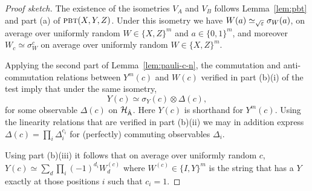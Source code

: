 \begin{proof}[Proof sketch]
The existence of the isometries $V_A$ and $V_B$ follows Lemma~\ref{lem:pbt} and part (a) of $\textsc{pbt}(X,Y,Z)$. 
 Under this isometry we have $W(a) \simeq_{\sqrt{\varepsilon}} \sigma_W(a)$, on average over uniformly random $W\in\{X,Z\}^m$ and $a\in\{0,1\}^m$, and moreover $W_c \simeq \sigma_W^c$ on average over uniformly random $W\in\{X,Z\}^m$. 

Applying the second part of Lemma~\ref{lem:pauli-c-n},  the  commutation and anti-commutation relations between $Y^m(c)$ and $W(c)$ verified in part (b)(i) of the test imply that under the same isometry,
$$ Y(c) \simeq \sigma_Y(c) \otimes {\Delta}(c),$$
for some observable ${\Delta}(c)$ on ${\mathcal{H}}_{\hat{{\textsf{A}}}}$. Here $Y(c)$ is shorthand for $Y^m(c)$. Using the linearity relations that are verified in part (b)(ii) we may in addition express $\Delta(c) = \prod_i \Delta_{i}^{c_i}$ for (perfectly) commuting observables $\Delta_i$. 




Using part (b)(iii) it follows that on average over uniformly random $c$, $Y(c)\simeq \sum_d \prod_i (-1)^{d_i} W^{(c)}_d$ where $W^{(c)} \in \{I,Y\}^m$ is the string that has a $Y$ exactly at those positions $i$ such that $c_i=1$. 



\end{proof}
